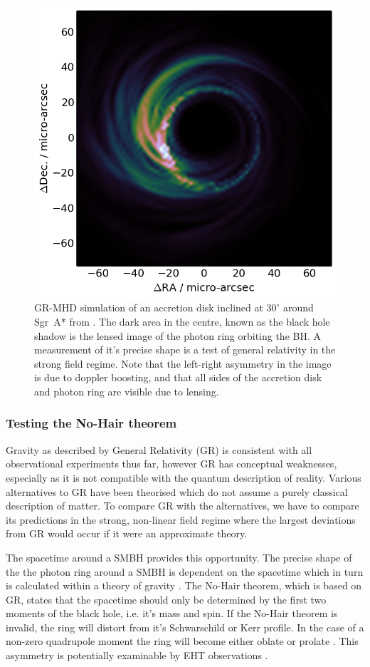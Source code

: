 \begin{figure}
\begin{center}
\includegraphics[width=0.5\columnwidth]{Images/disk30}
\caption{GR-MHD simulation of an accretion disk inclined at $30^\circ$ around Sgr~A* from \citet{Moscibrodzka_2014}. The dark area in the centre, known as the black hole shadow is the lensed image of the photon ring orbiting the BH. A measurement of it's precise shape is a test of general relativity in the strong field regime. Note that the left-right asymmetry in the image is due to doppler boosting, and that all sides of the accretion disk and photon ring are visible due to lensing. \label{fig:grmhd}%
}
\end{center}

\end{figure}
\subsubsection{Testing the No-Hair theorem}

Gravity as described by General Relativity (GR) is consistent with all observational experiments thus far, however GR has conceptual weaknesses, especially as it is not compatible with the quantum description of reality. Various alternatives to GR have been theorised which do not assume a purely classical description of matter. To compare GR with the alternatives, we have to compare its predictions in the strong, non-linear field regime where the largest deviations from GR would occur if it were an approximate theory.


The spacetime around a SMBH provides this opportunity. The precise shape of the the photon ring around a SMBH is dependent on the spacetime which in turn is calculated within a theory of gravity \citep{Takahashi_2004}. The No-Hair theorem, which is based on GR, states that the spacetime should only be determined by the first two moments of the black hole, i.e. it's mass and spin. If the No-Hair theorem is invalid, the ring will distort from it's Schwarschild or Kerr profile. In the case of a non-zero quadrupole moment the ring will become either oblate or prolate \citep{Johannsen_2010}. This asymmetry is potentially examinable by EHT observations \citep{Broderick_2014}.


